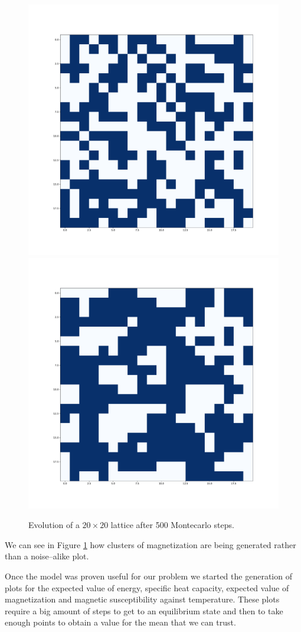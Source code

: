 \documentclass[
    10pt,
    journal,
    compsoc,
    english
]{IEEEtran}
\begin{document}
\begin{figure}[hbt]
    \centering
    \includegraphics[width=0.49\columnwidth]{img/s0.pdf}
    \includegraphics[width=0.49\columnwidth]{img/sf.pdf}
    \caption{Evolution of a $20\times20$ lattice after 500 Montecarlo steps.}
    \label{fig:states}
\end{figure}

We can see in Figure \ref{fig:states} how clusters of magnetization are being generated rather than a noise--alike plot.

Once the model was proven useful for our problem we started the generation of plots for the expected value of energy, specific heat capacity, expected value of magnetization and magnetic susceptibility against temperature. These plots require a big amount of steps to get to an equilibrium state and then to take enough points to obtain a value for the mean that we can trust.
\end{document}
